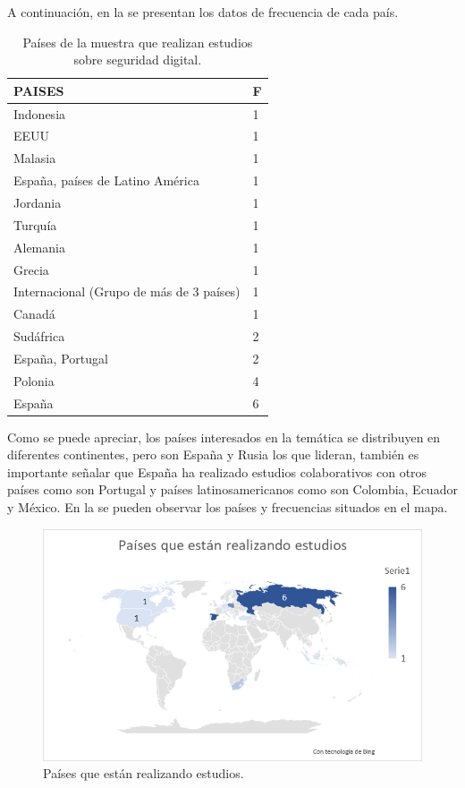 \documentclass[spanish]{textolivre}
\begin{document}
A continuación, en la  se presentan los datos de frecuencia de cada país.

\begin{table}[htbp]
\centering
\begin{threeparttable}
\caption{Países de la muestra que realizan estudios sobre seguridad digital.}
\label{tbl2}
\begin{tabular}{ll}
\toprule
PAISES & F  \\ 
\midrule
Indonesia & 1 \\
EEUU & 1 \\
Malasia & 1 \\
España, países de Latino América & 1 \\
Jordania & 1 \\
Turquía & 1 \\
Alemania & 1 \\
Grecia & 1 \\
Internacional (Grupo de más de 3 países) & 1 \\
Canadá & 1 \\
Sudáfrica & 2 \\
España, Portugal & 2 \\
Polonia & 4 \\
España & 6 \\ 
\bottomrule
\end{tabular}
\end{threeparttable}
\end{table}

Como se puede apreciar, los países interesados en la temática se distribuyen en diferentes continentes, pero son España y Rusia los que lideran, también es importante señalar que España ha realizado estudios colaborativos con otros países como son Portugal y países latinosamericanos como son Colombia, Ecuador y México. En la  se pueden observar los países y frecuencias situados en el mapa.

\begin{figure}[h!]
\centering
\begin{minipage}{0.75\textwidth}
\includegraphics[width=\textwidth]{Fig6.png}
\caption{Países que están realizando estudios.}
\label{fig6}
\end{minipage}
\end{figure}
\end{document}
